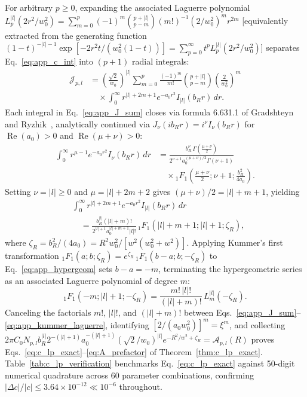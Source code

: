 \documentclass[aps,pra,reprint,amsmath,amssymb,floatfix,longbibliography]{revtex4-2}
\providecommand{\abs}[1]{\lvert#1\rvert}
\begin{document}
For arbitrary $p \ge 0$, expanding the associated Laguerre polynomial $L_p^{\abs{l}}(2r^2/w_0^2) = \sum_{m=0}^p (-1)^m \allowbreak \binom{p+\abs{l}}{p-m} \allowbreak (m!)^{-1} \allowbreak (2/w_0^2)^m r^{2m}$ [equivalently extracted from the generating function $(1-t)^{-\abs{l}-1}\allowbreak \exp[-2r^2 t/(w_0^2(1-t))] = \sum_{p=0}^\infty t^p L_p^{\abs{l}}(2r^2/w_0^2)$] separates Eq.~\eqref{eq:app_c_int} into $(p+1)$ radial integrals:
\begin{align}
\mathcal{J}_{p,l} &= \left(\frac{\sqrt{2}}{w_0}\right)^{\abs{l}} \sum_{m=0}^p \frac{(-1)^m}{m!}\binom{p+\abs{l}}{p-m}\left(\frac{2}{w_0^2}\right)^m \nonumber \\
&\quad \times \int_0^\infty r^{\abs{l}+2m+1} e^{-a_0 r^2} I_{\abs{l}}(b_R r)\,dr.
\label{eq:app_J_sum}
\end{align}
Each integral in Eq.~\eqref{eq:app_J_sum} closes via formula 6.631.1 of Gradshteyn and Ryzhik~\cite{Gradshteyn2014}, analytically continued via $J_\nu(i b_R r) = i^\nu I_\nu(b_R r)$ for $\operatorname{Re}(a_0) > 0$ and $\operatorname{Re}(\mu+\nu) > 0$:
\begin{align*}
\int_0^\infty r^{\mu-1} e^{-a_0 r^2} I_\nu(b_R r)\,dr &= \frac{b_R^\nu\,\Gamma\!\left(\frac{\mu+\nu}{2}\right)}{2^{\nu+1} a_0^{(\mu+\nu)/2}\Gamma(\nu+1)} \\
&\quad \times {_1F_1}\!\left(\frac{\mu+\nu}{2}; \nu+1; \frac{b_R^2}{4a_0}\right).
\end{align*}
Setting $\nu = \abs{l} \ge 0$ and $\mu = \abs{l} + 2m + 2$ gives $(\mu+\nu)/2 = \abs{l} + m + 1$, yielding
\begin{align}
&\int_0^\infty r^{\abs{l}+2m+1} e^{-a_0 r^2} I_{\abs{l}}(b_R r)\,dr \nonumber \\
&\quad = \frac{b_R^{\abs{l}}(\abs{l}+m)!}{2^{\abs{l}+1} a_0^{\abs{l}+m+1}\abs{l}!}\,{_1F_1}\!\left(\abs{l}+m+1; \abs{l}+1; \zeta_R\right),
\label{eq:app_hypergeom}
\end{align}
where $\zeta_R = b_R^2/(4a_0) = R^2 w_0^2/[w^2(w_0^2+w^2)]$. Applying Kummer's first transformation ${_1F_1}(a;b;\zeta_R) = e^{\zeta_R}\,{_1F_1}(b-a;b;-\zeta_R)$ to Eq.~\eqref{eq:app_hypergeom} sets $b - a = -m$, terminating the hypergeometric series as an associated Laguerre polynomial of degree $m$:
\begin{equation}
{_1F_1}\!\left(-m; \abs{l}+1; -\zeta_R\right) = \frac{m!\,\abs{l}!}{(\abs{l}+m)!}\,L_m^{\abs{l}}(-\zeta_R).
\label{eq:app_kummer_laguerre}
\end{equation}
Canceling the factorials $m!$, $\abs{l}!$, and $(\abs{l}+m)!$ between Eqs.~\eqref{eq:app_J_sum}--\eqref{eq:app_kummer_laguerre}, identifying $[2/(a_0 w_0^2)]^m = \xi^m$, and collecting $2\pi C_0 N_{p,l} b_R^{\abs{l}} 2^{-(\abs{l}+1)} a_0^{-(\abs{l}+1)} (\sqrt{2}/w_0)^{\abs{l}} e^{-R^2/w^2 + \zeta_R} = \mathcal{A}_{p,l}(R)$ proves Eqs.~\eqref{eq:c_lp_exact}--\eqref{eq:A_prefactor} of Theorem~\ref{thm:c_lp_exact}. Table~\ref{tab:c_lp_verification} benchmarks Eq.~\eqref{eq:c_lp_exact} against 50-digit numerical quadrature across 60 parameter combinations, confirming $\abs{\Delta c}/\abs{c} \le 3.64\times 10^{-12} \ll 10^{-6}$ throughout.
\end{document}
